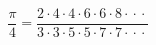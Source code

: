 \documentclass[12pt]{article}
\begin{document}
\sicpsize
\[
\frac{\pi}{4} = \frac{2 \cdot 4 \cdot 4 \cdot 6 \cdot 6 \cdot 8 \cdot {} \cdot {} \cdot {}}%
                     {3 \cdot 3 \cdot 5 \cdot 5 \cdot 7 \cdot 7 \cdot {} \cdot {} \cdot {}}
\]
\end{document}
